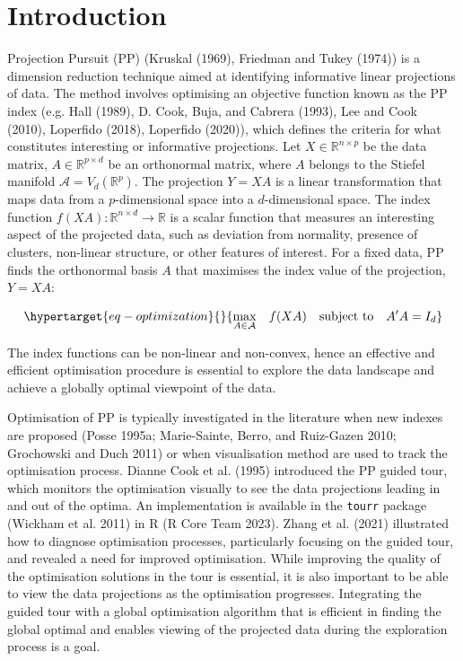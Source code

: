 \documentclass[
  12pt,
]{interact}
\theoremstyle{plain}
\begin{document}
\hypertarget{introduction}{%
\section{Introduction}\label{introduction}}

Projection Pursuit (PP) (Kruskal (1969), Friedman and Tukey (1974)) is a
dimension reduction technique aimed at identifying informative linear
projections of data. The method involves optimising an objective
function known as the PP index (e.g. Hall (1989), D. Cook, Buja, and
Cabrera (1993), Lee and Cook (2010), Loperfido (2018), Loperfido
(2020)), which defines the criteria for what constitutes interesting or
informative projections. Let \(X \in \mathbb{R}^{n\times p}\) be the
data matrix, \(A \in\mathbb{R}^{p \times d}\) be an orthonormal matrix,
where \(A\) belongs to the Stiefel manifold
\(\mathcal{A} = V_d(\mathbb{R}^p)\). The projection \(Y = XA\) is a
linear transformation that maps data from a \(p\)-dimensional space into
a \(d\)-dimensional space. The index function
\(f(XA): \mathbb{R}^{n \times d} \to \mathbb{R}\) is a scalar function
that measures an interesting aspect of the projected data, such as
deviation from normality, presence of clusters, non-linear structure, or
other features of interest. For a fixed data, PP finds the orthonormal
basis \(A\) that maximises the index value of the projection,
\(Y = XA\):

\begin{equation}\protect\hypertarget{eq-optimization}{}{
\underset{A \in \mathcal{A}}{\max } \quad f(XA) \quad \text{subject to} \quad A'A = I_d
}\label{eq-optimization}\end{equation}

The index functions can be non-linear and non-convex, hence an effective
and efficient optimisation procedure is essential to explore the data
landscape and achieve a globally optimal viewpoint of the data.

Optimisation of PP is typically investigated in the literature when new
indexes are proposed (Posse 1995a; Marie-Sainte, Berro, and Ruiz-Gazen
2010; Grochowski and Duch 2011) or when visualisation method are used to
track the optimisation process. Dianne Cook et al. (1995) introduced the
PP guided tour, which monitors the optimisation visually to see the data
projections leading in and out of the optima. An implementation is
available in the \texttt{tourr} package (Wickham et al. 2011) in R (R
Core Team 2023). Zhang et al. (2021) illustrated how to diagnose
optimisation processes, particularly focusing on the guided tour, and
revealed a need for improved optimisation. While improving the quality
of the optimisation solutions in the tour is essential, it is also
important to be able to view the data projections as the optimisation
progresses. Integrating the guided tour with a global optimisation
algorithm that is efficient in finding the global optimal and enables
viewing of the projected data during the exploration process is a goal.
\end{document}
